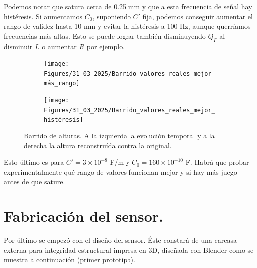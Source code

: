 Podemos notar que satura cerca de 0.25 mm y que a esta frecuencia de señal hay histéresis.	Si aumentamos $C_0$, suponiendo $C'$ fija, podemos conseguir aumentar el rango de validez hasta 10 mm y evitar la histéresis a 100 Hz, aunque querríamos frecuencias más altas. Esto se puede lograr también disminuyendo $Q_F$ al disminuir $L$ o aumentar $R$ por ejemplo.

\begin{figure}[!ht]
	\begin{minipage}[c]{0.5\textwidth}
		\begin{subfigure}{\textwidth}
			\centering
			\texttt{[image: Figures/31\_03\_2025/Barrido\_valores\_reales\_mejor\_más\_rango]}
			\captionsetup{width=0.8\textwidth}
			\subcaption{}
		\end{subfigure}
	\end{minipage}\begin{minipage}[c]{0.49\textwidth}
		\begin{subfigure}{\textwidth}
			\centering
			\texttt{[image: Figures/31\_03\_2025/Barrido\_valores\_reales\_mejor\_histéresis]}
			\captionsetup{width=0.8\textwidth}
			\subcaption{}
		\end{subfigure}
	\end{minipage}
	\caption{Barrido de alturas. A la izquierda la evolución temporal y a la derecha la altura reconstruída contra la original.}
	\label{fig:Barrido_alturas_mejor}
\end{figure}

Esto último es para $C'=3\times10^{-8}$ F/m y $C_0=160\times10^{-10}$ F. Habrá que probar experimentalmente qué rango de valores funcionan mejor y si hay más juego antes de que sature.

\clearpage
\section{Fabricación del sensor.}
Por último se empezó con el diseño del sensor. Éste constará de una carcasa externa para integridad estructural impresa en 3D, diseñada con Blender como se muestra a continuación (primer prototipo).

